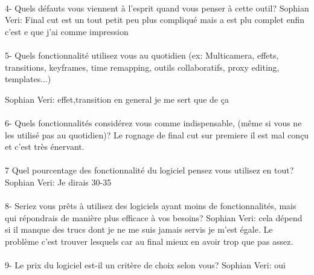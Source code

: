         \paragraph{}
         4- Quels défauts vous viennent à l'esprit quand vous penser à cette outil?
            Sophian Veri: Final cut est un tout petit peu plus compliqué mais a
            est plu complet enfin c'est e que j'ai comme impression


        \paragraph{}
         5-  Quels fonctionnalité utilisez vous au quotidien (ex: Multicamera, effets,
              transitions, keyframes, time remapping, outils collaboratifs, proxy
              editing, templates...)

            Sophian Veri: effet,transition en general je me sert que de ça

        \paragraph{}
         6-  Quels fonctionnalités considérez vous comme indispensable, (même si vous
                ne les utilisé pas au quotidien)?
            Le rognage de final cut sur premiere il est mal conçu et c'est très
            énervant.

        \paragraph{}
         7 Quel pourcentage des fonctionnalité du logiciel pensez vous utilisez
                en tout?
              Sophian Veri: Je dirais 30-35%

        \paragraph{}
         8- Seriez vous prêts à utilisez des logiciels ayant moins de fonctionnalités,
                mais qui répondrais de manière plus efficace à vos besoins?
              Sophian Veri: cela dépend si il manque des trucs dont je ne me
              suis jamais servis je m'est égale. Le problème c'est
              trouver lesquels car au final mieux en avoir trop que pas assez.

        \paragraph{}
          9-  Le prix du logiciel est-il un critère de choix selon vous?
              Sophian Veri: oui

